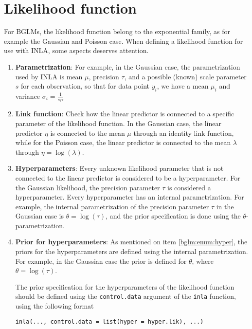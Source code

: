 \documentclass[a4paper,11pt]{report}
\newcommand{\tv}{\texttt}
\begin{document}
\section{Likelihood function}

For BGLMs, the likelihood function belong to the exponential family,
as for example the Gaussian and Poisson case. When defining a
likelihood function for use with INLA, some aspects deserves
attention.
\begin{enumerate}
\item \textbf{Parametrization}: For example, in the Gaussian case, the
    parametrization used by INLA is mean $\mu$, precision $\tau$, and
    a possible (known) scale parameter $s$ for each observation, so
    that for data point $y_i$, we have a mean $\mu_i$ and variance
    $\sigma_i = \frac{1}{s_i\tau}$

\item \textbf{Link function}: Check how the linear predictor is
    connected to a specific parameter of the likelihood function. In
    the Gaussian case, the linear predictor $\eta$ is connected to the
    mean $\mu$ through an identity link function, while for the
    Poisson case, the linear predictor is connected to the mean
    $\lambda$ through $\eta = \log (\lambda)$.

\item \label{bglm:enum:hyper} \textbf{Hyperparameters}: Every unknown
    likelihood parameter that is not connected to the linear predictor
    is considered to be a hyperparameter. For the Gaussian likelihood,
    the precision parameter $\tau$ is considered a
    hyperparameter. Every hyperparameter has an internal
    parametrization. For example, the internal parametrization of the
    precision parameter $\tau$ in the Gaussian case is $\theta = \log
    (\tau)$, and the prior specification is done using the
    $\theta$-parametrization.

\item \textbf{Prior for hyperparameters}: As mentioned on item
    \ref{bglm:enum:hyper}, the priors for the hyperparameters are
    defined using the internal parametrization. For example, in the
    Gaussian case the prior is defined for $\theta$, where $\theta =
    \log (\tau)$.

    The prior specification for the hyperparameters of the likelihood
    function should be defined using the \texttt{control.data}
    argument of the \tv{inla} function, using the following format

    \begin{center}
        \tv{inla(..., control.data = list(hyper = hyper.lik), ...)} 
    \end{center}
    

\end{enumerate}
\end{document}
